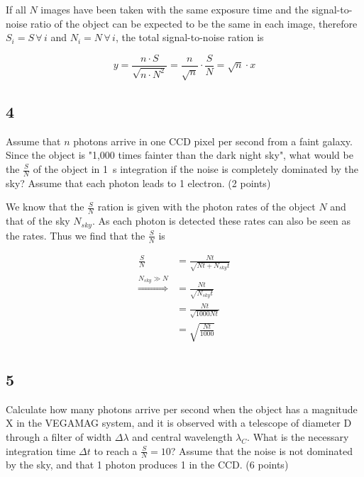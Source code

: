 \documentclass[11pt,a4paper,twoside]{article}
\newcommand{\electron}{\ce{e^-}}
\newcommand{\SNR}{\ensuremath{\frac{S}{N}} }
\begin{document}
If all $N$ images have been taken with the same exposure time and the signal-to-noise ratio of the object can be expected to be the same in each image, therefore $S_i = S \, \forall \, i$ and $N_i = N \, \forall \, i$, the total signal-to-noise ration is 

\begin{equation}
 y = \frac{n \cdot S}{\sqrt{n \cdot N^2}} = \frac{n}{\sqrt{n}} \cdot \frac{S}{N} = \sqrt{n} \cdot x
\end{equation}

\subsection*{4}
 Assume that $n$ photons arrive in one CCD pixel per second from a faint galaxy.
Since the object is "1,000 times fainter than the dark night sky", what would 
be the \SNR of the object in \SI{1}{\second} integration if the noise 
is completely dominated by the sky? Assume that each photon leads to 1 electron. 
(2 points)

We know that the \SNR ration is given with the photon rates of the object $N$
and that of the sky $N_{sky}$. As each photon is detected these rates can also
be seen as the \electron rates. Thus we find that the \SNR is

\begin{align}
    \frac{S}{N} &=  \frac{Nt}{\sqrt{Nt + N_{sky}t}} \\
    \overset{N_{sky}\gg N}{\Rightarrow} &=\frac{Nt}{\sqrt{N_{sky}t}} \\
    &= \frac{Nt}{\sqrt{1000Nt}} \\
    &= \sqrt{\frac{Nt}{1000}} \\
\end{align}

\subsection*{5}

Calculate how many photons arrive per second when the object has a magnitude X 
in the VEGAMAG system, and it is observed with a telescope of diameter D 
through a filter of width $\Delta\lambda$ and central wavelength $\lambda_C$. 
What is the necessary integration time $\Delta t$ to reach a $\SNR=10$? 
Assume that the noise is not dominated by the sky, and that 1 photon produces 1
\electron in the CCD. (6 points)

\end{document}
